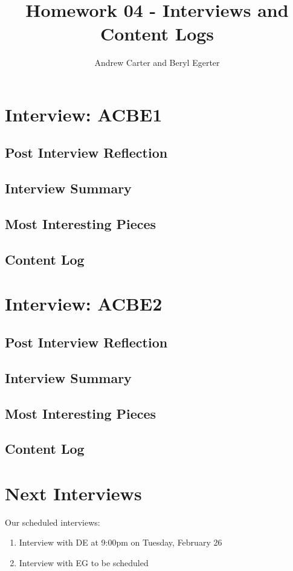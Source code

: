 \documentclass{article}
\title{Homework 04 - Interviews and Content Logs}
\author{Andrew Carter and Beryl Egerter}
\begin{document}
\maketitle
\section{Interview: ACBE1}
\subsection{Post Interview Reflection}
\subsection{Interview Summary}
\subsection{Most Interesting Pieces}
\subsection{Content Log}
\section{Interview: ACBE2}
\subsection{Post Interview Reflection}
\subsection{Interview Summary}
\subsection{Most Interesting Pieces}
\subsection{Content Log}
\section{Next Interviews}
Our scheduled interviews:
\begin{enumerate}
  \item Interview with DE at 9:00pm on Tuesday, February 26
  \item Interview with EG to be scheduled
\end{enumerate}
\end{document}
